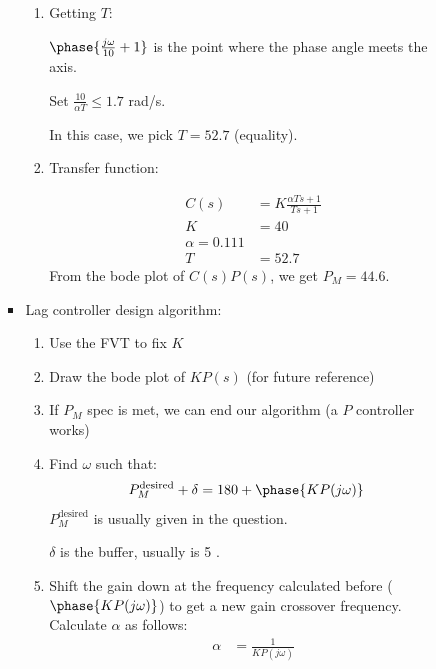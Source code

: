 \begin{enumerate}
\begin{enumerate}
\begin{itemize}
\begin{enumerate}
                            \item Getting $T$:

                                $\phase{\frac{j\omega}{10} + 1}$ is the point where the phase angle meets the axis.

                                Set $\frac{10}{\alpha T} \le 1.7$ rad/s.

                                In this case, we pick $T = 52.7$ (equality).

                            \item Transfer function:

                                \begin{align*}
                                    C(s) &= K \frac{\alpha T s + 1}{T s + 1} \\
                                    K &= 40 \\
                                    \alpha = 0.111 \\
                                    T &= 52.7
                                \end{align*}
                                From the bode plot of $C(s)P(s)$, we get $P_M = 44.6$\textdegree.
                        \end{enumerate}
                    \item Lag controller design algorithm:

                        \begin{enumerate}
                            \item Use the FVT to fix $K$
                            \item Draw the bode plot of $KP(s)$ (for future reference)
                            \item If $P_M$ spec is met, we can end our algorithm (a $P$ controller works)
                            \item Find $\omega$ such that:
                                \begin{align*}
                                    P_M^{\text{desired}} + \delta &= 180 + \phase{K P(j \omega)}
                                \end{align*}
                                $P_M^{\text{desired}}$ is usually given in the question.

                                $\delta$ is the buffer, usually is 5 \textdegree.
                            \item Shift the gain down at the frequency calculated before ($\phase{K P (j \omega)}$) to get a new gain crossover frequency. Calculate $\alpha$ as follows:
                                \begin{align*}
                                    \alpha &= \frac{1}{KP(j \omega)}
                                \end{align*}


\end{enumerate}
\end{itemize}
\end{enumerate}
\end{enumerate}
